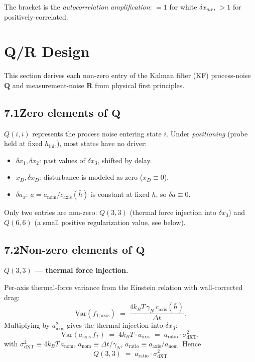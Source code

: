 \documentclass[11pt]{article}
\begin{document}
\noindent The bracket is the \emph{autocorrelation amplification}: $=1$ for white $\delta x_{mr}$, $>\!1$ for positively-correlated.

\section{Q/R Design}

This section derives each non-zero entry of the Kalman filter (KF) process-noise $\bm{Q}$ and measurement-noise $\bm{R}$ from physical first principles.

\subsection*{7.1\quad Zero elements of $\bm{Q}$}

\noindent $Q(i,i)$ represents the process noise entering state $i$. Under \emph{positioning} (probe held at fixed $h_{\mathrm{init}}$), most states have no driver:

\begin{itemize}
\item $\delta x_1, \delta x_2$: past values of $\delta x_3$, shifted by delay.
\item $x_D, \delta x_D$: disturbance is modeled as zero ($x_D \equiv 0$).
\item $\delta a_x$: $a = a_{\mathrm{nom}}/c_{\mathrm{axis}}(\bar h)$ is constant at fixed $h$, so $\delta a \equiv 0$.
\end{itemize}

\noindent Only two entries are non-zero: $Q(3,3)$ (thermal force injection into $\delta x_3$) and $Q(6,6)$ (a small positive regularization value, see below).

\bigskip
\subsection*{7.2\quad Non-zero elements of $\bm{Q}$}

\noindent\textbf{$Q(3,3)$ --- thermal force injection.}

\smallskip
\noindent Per-axis thermal-force variance from the Einstein relation with wall-corrected drag:
\begin{equation}
\mathrm{Var}(f_{T,\mathrm{axis}}) \;=\; \frac{4 k_B T\,\gamma_N\,c_\mathrm{axis}(\bar h)}{\Delta t}.
\end{equation}
Multiplying by $a_\mathrm{axis}^2$ gives the thermal injection into $\delta x_3$:
\begin{equation}
\mathrm{Var}(a_\mathrm{axis}\, f_T) \;=\; 4 k_B T \cdot a_\mathrm{axis} \;=\; a_\mathrm{ratio}\cdot\sigma^2_\mathrm{dXT},
\end{equation}
with $\sigma^2_\mathrm{dXT} \equiv 4 k_B T\, a_\mathrm{nom}$, $a_\mathrm{nom} \equiv \Delta t/\gamma_N$, $a_\mathrm{ratio} \equiv a_\mathrm{axis}/a_\mathrm{nom}$. Hence
\begin{equation}
\boxed{\;Q(3,3) \;=\; a_\mathrm{ratio} \cdot \sigma^2_\mathrm{dXT}\;}
\end{equation}
\end{document}
